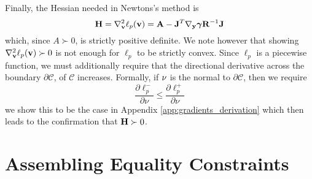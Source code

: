Finally, the Hessian needed in Newtons's method is
\begin{equation}
	\mf{H}= \nabla_\mf{v}^2\ell_p(\mf{v}) = \mf{A} -\mf{J}^T\nabla_\mf{y}\bgamma \mf{R}^{-1}\mf{J}	
	\label{eq:ell_hessian}
\end{equation}
which, since $A\succ 0$, is strictly positive definite. We note however that
showing $\nabla_{\mathbf{v}}^2\ell_p({\mathbf{v}})\succ 0$ is not enough for $\ell_p$ to be
strictly convex. Since $\ell_p$ is a piecewise function, we must additionally
require that the directional derivative across the boundary
$\partial\mathcal{C}$, of $\mathcal{C}$ increases. Formally, if ${\mathbf{\nu}}$ is
the normal to $\partial\mathcal{C}$, then we require
\begin{equation}
	\frac{\partial \ell_p^-}{\partial \nu} \le \frac{\partial \ell_p^+}{\partial \nu}
\end{equation}
we show this to be the case in Appendix \ref{app:gradients_derivation} which
then leads to the confirmation that ${\mathbf{H}}\succ 0$.


\section{Assembling Equality Constraints}
\label{sec:assembling_equality_constraints}
